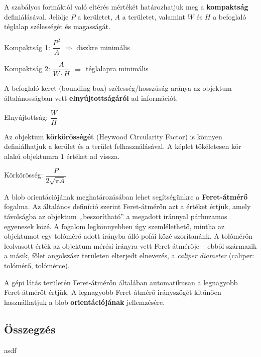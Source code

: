 \bigskip

A szabályos formáktól való eltérés mértékét határozhatjuk meg a \textbf{kompaktság} definiálásával. Jelölje $P$ a kerületet, $A$ a területet, valamint $W$ és $H$ a befoglaló téglalap szélességét és magasságát.

\begin{definition}{Kompaktság 1:}
$\dfrac{P^2}{A}$ $\Longrightarrow$ diszkre minimális
\end{definition}

\begin{definition}{Kompaktság 2:}
$\dfrac{A}{W \cdot H}$ $\Longrightarrow$ téglalapra minimális
\end{definition}

\bigskip

A befoglaló keret (bounding box) szélesség/hosszúság aránya az objektum általánosságban vett \textbf{elnyújtottságáról} ad információt. 

\begin{definition}{Elnyújtottság:}
$\dfrac{W}{H}$
\end{definition}

\bigskip

Az objektum \textbf{körkörösségét} (Heywood Circularity Factor) is könnyen definiálhatjuk a kerület és a terület felhasználásával. A képlet tökéletesen kör alakú objektumra $1$ értéket ad vissza.

\begin{definition}{Körkörösség:}
$\dfrac{P}{2 \sqrt{\pi A}}$
\end{definition}

\bigskip

A blob orientációjának meghatározásában lehet segítségünkre a \textbf{Feret-átmérő} fogalma. Az általános definíció szerint Feret-átmérőn azt a értéket értjük, amely távolságba az objektum ,,beszorítható'' a megadott iránnyal párhuzamos egyenesek közé. A fogalom legkönnyebben úgy szemlélethető, mintha az objektumot egy tolómérő adott irányba álló pofái közé szorítanánk. A tolómérőn leolvasott érték az objektum mérési irányra vett Feret-átmérője -- ebből származik a másik, főlet angolszász területen elterjedt elnevezés, a \emph{caliper diameter} (caliper: tolómérő, tolómérce). 

A gépi látás területén Feret-átmérőn általában automatikusan a legnagyobb Feret-átmérőt értjük. A legnagyobb Feret-átmérő irányszögét kitűnően használhatjuk a blob \textbf{orientációjának} jellemzésére.

\subsection{Összegzés}\label{sect:blob_osszegzes}

asdf